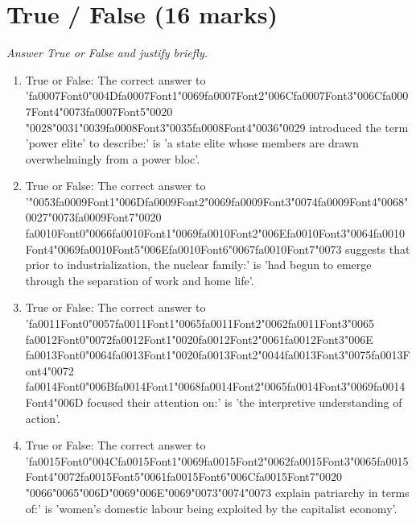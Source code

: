 \documentclass[12pt]{article}
\begin{document}
\section*{True / False (16 marks)}
\textit{Answer True or False and justify briefly.}
\begin{enumerate}[label=\arabic*.]
\item True or False: The correct answer to '{\csname fa0007Font0\endcsname\char"004D}{\csname fa0007Font1\endcsname\char"0069}{\csname fa0007Font2\endcsname\char"006C}{\csname fa0007Font3\endcsname\char"006C}{\csname fa0007Font4\endcsname\char"0073}{\csname fa0007Font5\endcsname\char"0020} {\char"0028}{\char"0031}{\char"0039}{\csname fa0008Font3\endcsname\char"0035}{\csname fa0008Font4\endcsname\char"0036}{\char"0029} introduced the term 'power elite' to describe:' is 'a state elite whose members are drawn overwhelmingly from a power bloc'.
\item True or False: The correct answer to '{\char"0053}{\csname fa0009Font1\endcsname\char"006D}{\csname fa0009Font2\endcsname\char"0069}{\csname fa0009Font3\endcsname\char"0074}{\csname fa0009Font4\endcsname\char"0068}{\char"0027}{\char"0073}{\csname fa0009Font7\endcsname\char"0020} {\csname fa0010Font0\endcsname\char"0066}{\csname fa0010Font1\endcsname\char"0069}{\csname fa0010Font2\endcsname\char"006E}{\csname fa0010Font3\endcsname\char"0064}{\csname fa0010Font4\endcsname\char"0069}{\csname fa0010Font5\endcsname\char"006E}{\csname fa0010Font6\endcsname\char"0067}{\csname fa0010Font7\endcsname\char"0073} suggests that prior to industrialization, the nuclear family:' is 'had begun to emerge through the separation of work and home life'.
\item True or False: The correct answer to '{\csname fa0011Font0\endcsname\char"0057}{\csname fa0011Font1\endcsname\char"0065}{\csname fa0011Font2\endcsname\char"0062}{\csname fa0011Font3\endcsname\char"0065} {\csname fa0012Font0\endcsname\char"0072}{\csname fa0012Font1\endcsname\char"0020}{\csname fa0012Font2\endcsname\char"0061}{\csname fa0012Font3\endcsname\char"006E} {\csname fa0013Font0\endcsname\char"0064}{\csname fa0013Font1\endcsname\char"0020}{\csname fa0013Font2\endcsname\char"0044}{\csname fa0013Font3\endcsname\char"0075}{\csname fa0013Font4\endcsname\char"0072} {\csname fa0014Font0\endcsname\char"006B}{\csname fa0014Font1\endcsname\char"0068}{\csname fa0014Font2\endcsname\char"0065}{\csname fa0014Font3\endcsname\char"0069}{\csname fa0014Font4\endcsname\char"006D} focused their attention on:' is 'the interpretive understanding of action'.
\item True or False: The correct answer to '{\csname fa0015Font0\endcsname\char"004C}{\csname fa0015Font1\endcsname\char"0069}{\csname fa0015Font2\endcsname\char"0062}{\csname fa0015Font3\endcsname\char"0065}{\csname fa0015Font4\endcsname\char"0072}{\csname fa0015Font5\endcsname\char"0061}{\csname fa0015Font6\endcsname\char"006C}{\csname fa0015Font7\endcsname\char"0020} {\char"0066}{\char"0065}{\char"006D}{\char"0069}{\char"006E}{\char"0069}{\char"0073}{\char"0074}{\char"0073} explain patriarchy in terms of:' is 'women's domestic labour being exploited by the capitalist economy'.

\end{enumerate}
\end{document}
